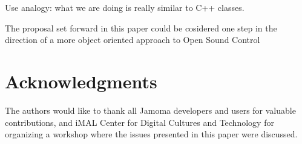 \documentclass{NIME-alternate}
\begin{document}
Use analogy: what we are doing is really similar to C++ classes.

The proposal set forward in this paper could be cosidered one step in the direction of a more object oriented approach to Open Sound Control









\section{Acknowledgments} %
\label{sec:acknowledgments}

The authors would like to thank all Jamoma developers and users for valuable contributions, and iMAL Center for Digital Cultures and Technology for organizing a workshop where the issues presented in this paper were discussed.





%
\begin{small}

\end{small}
%


\balancecolumns %
\end{document}
